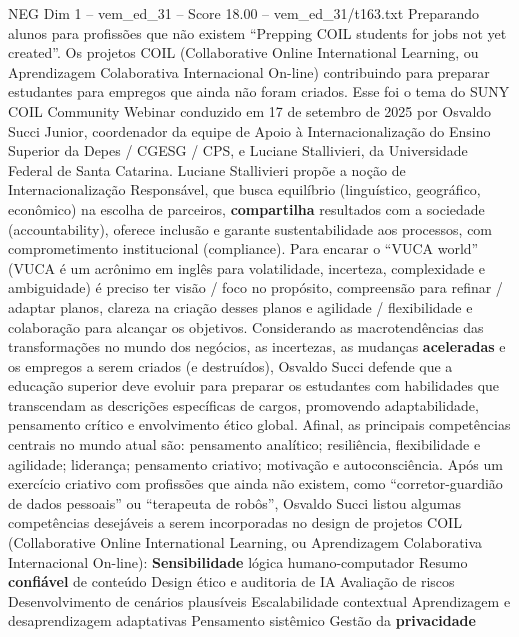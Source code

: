 \begin{textsample}{NEG Dim 1 – vem\_ed\_31 – Score 18.00 – vem\_ed\_31/t163.txt}  \label{ex:f1_neg_150}
Preparando alunos para profissões que não existem “Prepping COIL students for jobs not yet created”.
Os projetos COIL (Collaborative Online International Learning, ou Aprendizagem Colaborativa Internacional On-line) contribuindo para preparar estudantes para empregos que ainda não foram criados.
Esse foi o tema do SUNY COIL Community Webinar conduzido em 17 de setembro de 2025 por Osvaldo Succi Junior, coordenador da equipe de Apoio à Internacionalização do Ensino Superior da Depes / CGESG / CPS, e Luciane Stallivieri, da Universidade Federal de Santa Catarina.
Luciane Stallivieri propõe a noção de Internacionalização Responsável, que busca equilíbrio (linguístico, geográfico, econômico) na escolha de parceiros, \textbf{compartilha} resultados com a sociedade (accountability), oferece inclusão e garante sustentabilidade aos processos, com comprometimento institucional (compliance).
Para encarar o “VUCA world” (VUCA é um acrônimo em inglês para volatilidade, incerteza, complexidade e ambiguidade) é preciso ter visão / foco no propósito, compreensão para refinar / adaptar planos, clareza na criação desses planos e agilidade / flexibilidade e colaboração para alcançar os objetivos.
Considerando as macrotendências das transformações no mundo dos negócios, as incertezas, as mudanças \textbf{aceleradas} e os empregos a serem criados (e destruídos), Osvaldo Succi defende que a educação superior deve evoluir para preparar os estudantes com habilidades que transcendam as descrições específicas de cargos, promovendo adaptabilidade, pensamento crítico e envolvimento ético global.
Afinal, as principais competências centrais no mundo atual são: pensamento analítico; resiliência, flexibilidade e agilidade; liderança; pensamento criativo; motivação e autoconsciência.
Após um exercício criativo com profissões que ainda não existem, como “corretor-guardião de dados pessoais” ou “terapeuta de robôs”, Osvaldo Succi listou algumas competências desejáveis a serem incorporadas no design de projetos COIL (Collaborative Online International Learning, ou Aprendizagem Colaborativa Internacional On-line): \textbf{Sensibilidade} lógica humano-computador Resumo \textbf{confiável} de conteúdo Design ético e auditoria de IA Avaliação de riscos Desenvolvimento de cenários plausíveis Escalabilidade contextual Aprendizagem e desaprendizagem adaptativas Pensamento sistêmico Gestão da \textbf{privacidade}

\end{textsample}
